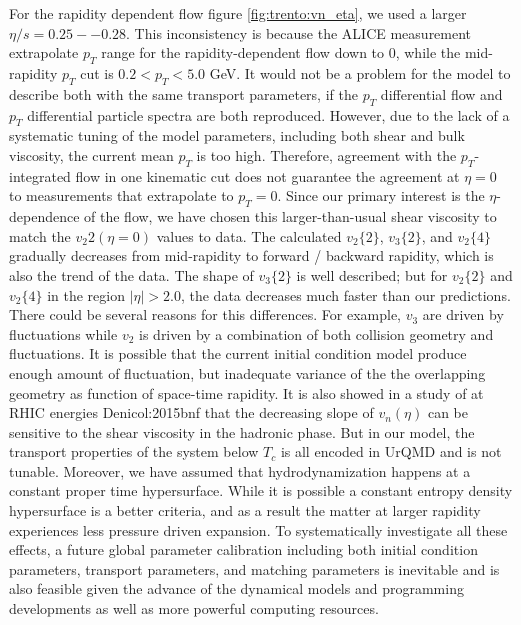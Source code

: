 For the rapidity dependent flow figure \ref{fig:trento:vn_eta}, we used a larger $\eta/s=0.25--0.28$. 
This inconsistency is because the ALICE measurement extrapolate $p_T$ range for the rapidity-dependent flow down to 0, while the mid-rapidity  $p_T$ cut is $0.2 < p_T < 5.0$ GeV.
It would not be a problem for the model to describe both with the same transport parameters, if the $p_T$ differential flow and $p_T$ differential particle spectra are both reproduced.
However, due to the lack of a systematic tuning of the model parameters, including both shear and bulk viscosity, the current mean $p_T$ is too high.
Therefore, agreement with the $p_T$-integrated flow in one kinematic cut does not guarantee the agreement at $\eta=0$ to measurements that extrapolate to $p_T = 0$.
Since our primary interest is the $\eta$-dependence of the flow, we have chosen this larger-than-usual shear viscosity to match the $v_2{2}(\eta=0)$ values to data.
The calculated $v_2\{2\}$, $v_3\{2\}$, and $v_2\{4\}$ gradually decreases from mid-rapidity to forward / backward rapidity, which is also the trend of the data.
The shape of $v_3\{2\}$ is well described; but for $v_2\{2\}$ and $v_2\{4\}$ in the region $|\eta| > 2.0$, the data decreases much faster than our predictions.
There could be several reasons for this differences.
For example, $v_3$ are driven by fluctuations while $v_2$ is driven by a combination of both collision geometry and fluctuations. It is possible that the current initial condition model produce enough amount of fluctuation, but inadequate variance of the the overlapping geometry as function of space-time rapidity.
It is also showed in a study of at RHIC energies {Denicol:2015bnf} that the decreasing slope of $v_n(\eta)$ can be sensitive to the shear viscosity in the hadronic phase. 
But in our model, the transport properties of the system below $T_c$ is all encoded in UrQMD and is not tunable. 
Moreover, we have assumed that hydrodynamization happens at a constant proper time hypersurface. 
While it is possible a constant entropy density hypersurface is a better criteria, and as a result the matter at larger rapidity experiences less pressure driven expansion.
To systematically investigate all these effects, a future global parameter calibration including both initial condition parameters, transport parameters, and matching parameters is inevitable and is also feasible given the advance of the dynamical models and programming developments as well as more powerful computing resources.


